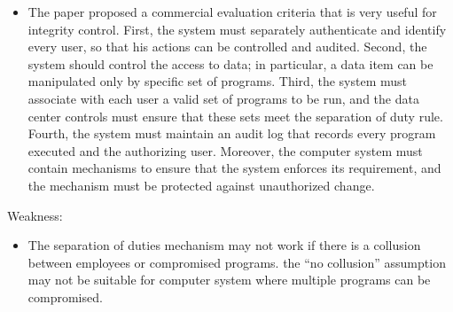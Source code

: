 \documentclass[11pt]{article}
\begin{document}
\begin{description}
{\begin{itemize}
\begin{mdframed}
\begin{itemize}
		\item The paper proposed a commercial evaluation criteria that is very useful for integrity control. First,  the system must separately authenticate and identify every user, so that his actions can be controlled and audited. Second, the system should control the access to data; in particular, a data item can be manipulated only by specific set of programs. Third, the system must associate with each user a valid set of programs to be run, and the data center controls must ensure that these sets meet the separation of duty rule. Fourth, the system must maintain an audit log that records every program executed and the authorizing user. Moreover, the computer system must contain mechanisms to ensure that the system enforces its requirement, and the mechanism must be protected against unauthorized change.
	\end{itemize}
	Weakness:
	\begin{itemize}
		\item The separation of duties mechanism may not work if there is a collusion between employees or compromised programs. the ``no collusion'' assumption may not be suitable for computer system where multiple programs can be compromised. 
	\end{itemize}
\end{mdframed}

\end{itemize}
}


\end{description}
\end{document}
